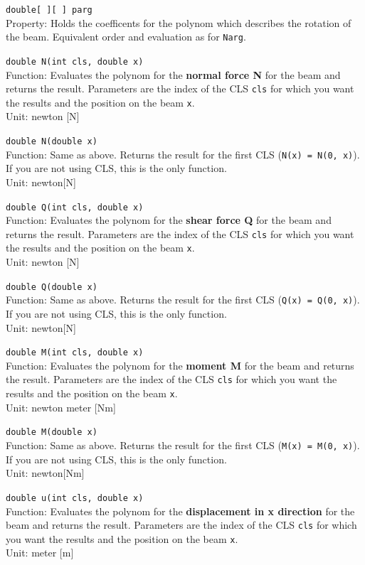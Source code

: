\begin{trivlist}
\begin{trivlist}
		\item[] \texttt{double[\ ][\ ] parg} \\Property: Holds the coefficents for the polynom which describes the rotation of the beam. Equivalent order and evaluation  as for \texttt{Narg}.
		\item[] \texttt{double N(int cls, double x)} \\Function: Evaluates the polynom for the \textbf{normal force N} for the beam and returns the result. Parameters are the index of the CLS \texttt{cls} for which you want the results and the position on the beam \texttt{x}. \\Unit: newton [N]
		\item[] \texttt{double N(double x)} \\Function: Same as above. Returns the result for the first CLS (\texttt{N(x) = N(0, x)}). If you are not using CLS, this is the only function.\\Unit: newton[N]
		\item[] \texttt{double Q(int cls, double x)} \\Function: Evaluates the polynom for the \textbf{shear force Q} for the beam and returns the result. Parameters are the index of the CLS \texttt{cls} for which you want the results and the position on the beam \texttt{x}. \\Unit: newton [N]
			\item[] \texttt{double Q(double x)} \\Function: Same as above. Returns the result for the first CLS (\texttt{Q(x) = Q(0, x)}). If you are not using CLS, this is the only function.\\Unit: newton[N]
		\item[] \texttt{double M(int cls, double x)} \\Function: Evaluates the polynom for the \textbf{moment M} for the beam and returns the result. Parameters are the index of the CLS \texttt{cls} for which you want the results and the position on the beam \texttt{x}. \\Unit: newton meter [Nm]
		\item[] \texttt{double M(double x)} \\Function: Same as above. Returns the result for the first CLS (\texttt{M(x) = M(0, x)}). If you are not using CLS, this is the only function.\\Unit: newton[Nm]
		\item[] \texttt{double u(int cls, double x)} \\Function: Evaluates the polynom for the \textbf{displacement in x direction} for the beam and returns the result. Parameters are the index of the CLS \texttt{cls} for which you want the results and the position on the beam \texttt{x}. \\Unit: meter [m]

\end{trivlist}
\end{trivlist}
